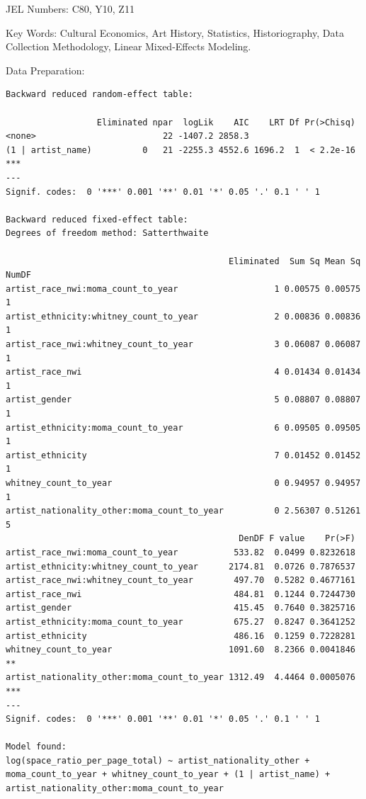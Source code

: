 \documentclass[
  letterpaper,
  DIV=11,
  numbers=noendperiod]{scrreprt}
\begin{document}
JEL Numbers: C80, Y10, Z11

Key Words: Cultural Economics, Art History, Statistics, Historiography,
Data Collection Methodology, Linear Mixed-Effects Modeling.

Data Preparation:

\begin{verbatim}
Backward reduced random-effect table:

                  Eliminated npar  logLik    AIC    LRT Df Pr(>Chisq)    
<none>                         22 -1407.2 2858.3                         
(1 | artist_name)          0   21 -2255.3 4552.6 1696.2  1  < 2.2e-16 ***
---
Signif. codes:  0 '***' 0.001 '**' 0.01 '*' 0.05 '.' 0.1 ' ' 1

Backward reduced fixed-effect table:
Degrees of freedom method: Satterthwaite 

                                            Eliminated  Sum Sq Mean Sq NumDF
artist_race_nwi:moma_count_to_year                   1 0.00575 0.00575     1
artist_ethnicity:whitney_count_to_year               2 0.00836 0.00836     1
artist_race_nwi:whitney_count_to_year                3 0.06087 0.06087     1
artist_race_nwi                                      4 0.01434 0.01434     1
artist_gender                                        5 0.08807 0.08807     1
artist_ethnicity:moma_count_to_year                  6 0.09505 0.09505     1
artist_ethnicity                                     7 0.01452 0.01452     1
whitney_count_to_year                                0 0.94957 0.94957     1
artist_nationality_other:moma_count_to_year          0 2.56307 0.51261     5
                                              DenDF F value    Pr(>F)    
artist_race_nwi:moma_count_to_year           533.82  0.0499 0.8232618    
artist_ethnicity:whitney_count_to_year      2174.81  0.0726 0.7876537    
artist_race_nwi:whitney_count_to_year        497.70  0.5282 0.4677161    
artist_race_nwi                              484.81  0.1244 0.7244730    
artist_gender                                415.45  0.7640 0.3825716    
artist_ethnicity:moma_count_to_year          675.27  0.8247 0.3641252    
artist_ethnicity                             486.16  0.1259 0.7228281    
whitney_count_to_year                       1091.60  8.2366 0.0041846 ** 
artist_nationality_other:moma_count_to_year 1312.49  4.4464 0.0005076 ***
---
Signif. codes:  0 '***' 0.001 '**' 0.01 '*' 0.05 '.' 0.1 ' ' 1

Model found:
log(space_ratio_per_page_total) ~ artist_nationality_other + moma_count_to_year + whitney_count_to_year + (1 | artist_name) + artist_nationality_other:moma_count_to_year
\end{verbatim}
\end{document}
